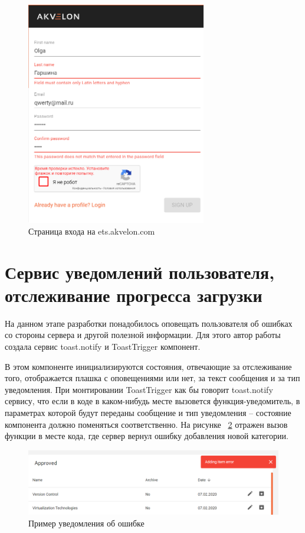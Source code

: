\documentclass[12pt, a4paper]{diplom}
\begin{document}
\begin{figure}[!ht]
\centering
\includegraphics[width=0.7\textwidth]{resources/signup.png}
\caption{Страница входа на ets.akvelon.com}
\label{fig:1}
\end{figure}

\section{Сервис уведомлений пользователя, отслеживание прогресса загрузки}

На данном этапе разработки понадобилось оповещать пользователя об ошибках со стороны сервера и другой полезной информации.
Для этого автор работы создала сервис toast.notify и ToastTrigger компонент.

В этом компоненте инициализируются состояния, отвечающие за отслеживание того, отображается плашка с оповещениями или нет, за текст сообщения и за тип уведомления.
При монтировании ToastTrigger как бы говорит toast.notify сервису, что если в коде в каком-нибудь месте вызовется функция-уведомитель, в параметрах которой будут переданы сообщение и тип уведомления -- состояние
компонента должно поменяться соответственно. На рисунке ~\ref{4} отражен вызов функции в месте кода, где сервер вернул ошибку добавления новой категории.

\begin{figure}[!ht]
\centering
\includegraphics[width=1\textwidth]{resources/toasterror.png}
\caption{Пример уведомления об ошибке}
\label{4}
\end{figure}
\end{document}
